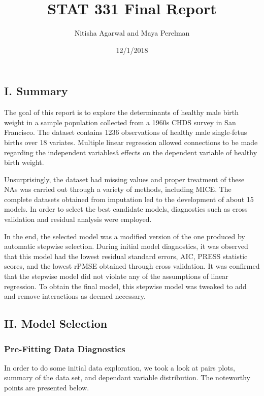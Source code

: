 \documentclass[]{article}
\title{STAT 331 Final Report}
\author{Nitisha Agarwal and Maya Perelman}
\date{12/1/2018}
\begin{document}
\maketitle

\subsection{I. Summary}\label{i.-summary}

The goal of this report is to explore the determinants of healthy male
birth weight in a sample population collected from a 1960s CHDS survey
in San Francisco. The dataset contains 1236 observations of healthy male
single-fetus births over 18 variates. Multiple linear regression allowed
connections to be made regarding the independent variablesâ effects on
the dependent variable of healthy birth weight.

Unsurprisingly, the dataset had missing values and proper treatment of
these NAs was carried out through a variety of methods, including MICE.
The complete datasets obtained from imputation led to the development of
about 15 models. In order to select the best candidate models,
diagnostics such as cross validation and residual analysis were
employed.

In the end, the selected model was a modified version of the one
produced by automatic stepwise selection. During initial model
diagnostics, it was observed that this model had the lowest residual
standard errors, AIC, PRESS statistic scores, and the lowest rPMSE
obtained through cross validation. It was confirmed that the stepwise
model did not violate any of the assumptions of linear regression. To
obtain the final model, this stepwise model was tweaked to add and
remove interactions as deemed necessary.

\subsection{II. Model Selection}\label{ii.-model-selection}

\subsubsection{Pre-Fitting Data
Diagnostics}\label{pre-fitting-data-diagnostics}

In order to do some initial data exploration, we took a look at pairs
plots, summary of the data set, and dependant variable distribution. The
noteworthy points are presented below.
\end{document}
